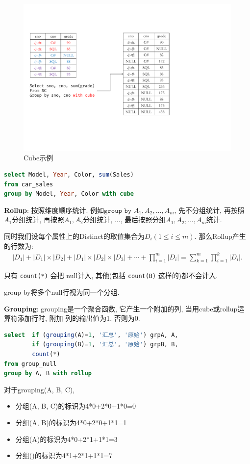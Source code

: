 \begin{figure}[H]
    \centering
    \includegraphics[width=.6\textwidth]{figure/with_cube.pdf}
    \caption{Cube示例}
\end{figure}

\begin{lstlisting}[language=SQL]
select Model, Year, Color, sum(Sales)
from car_sales
group by Model, Year, Color with cube
\end{lstlisting}

\textbf{Rollup}: 按照维度顺序统计. 例如$\texttt{group by }A_1,A_2,...,A_m$, 先不分组统计, 再按照$A_1$分组统计, 再按照$A_1,A_2$分组统计, ..., 最后按照分组$A_1,A_2,...,A_m$统计.

同时我们设每个属性上的Distinct的取值集合为$D_i(1\leq i\leq m)$.
那么Rollup产生的行数为:
\begin{align*}
    |D_1| + |D_1|\times |D_2| + |D_1|\times |D_2| \times |D_3| + \cdots + \prod_{i=1}^m |D_i| = \sum_{k=1}^m \prod_{i=1}^k |D_i|.
\end{align*}

只有 \verb|count(*)| 会把 null计入, 其他(包括 \verb|count(B)| 这样的)都不会计入.

group by将多个null行视为同一个分组.

\textbf{Grouping}: grouping是一个聚合函数, 它产生一个附加的列, 当用cube或rollup运算符添加行时, 附加
列的输出值为1, 否则为0.

\begin{lstlisting}[language=SQL]
select  if (grouping(A)=1, '汇总', '原始') grpA, A,
        if (grouping(B)=1, '汇总', '原始') grpB, B,
        count(*)
from group_null
group by A, B with rollup
\end{lstlisting}

对于grouping(A, B, C), 
\begin{itemize}
  \item 分组(A, B, C)的标识为4*0+2*0+1*0=0
  \item 分组(A, B)的标识为4*0+2*0+1*1=1
  \item 分组(A)的标识为4*0+2*1+1*1=3
  \item 分组()的标识为4*1+2*1+1*1=7
\end{itemize}

